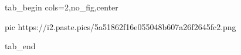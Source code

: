  
 
 
 
 


\ifcmt
  tab_begin cols=2,no_fig,center

     pic https://i2.paste.pics/5a51862f16e055048b607a26f2645fc2.png

  tab_end
\fi
